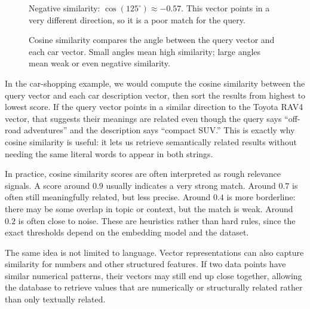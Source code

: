 \documentclass[12pt]{article}
\begin{document}
\begin{figure}[h]
\begin{minipage}[t]{0.31\textwidth}
\vspace{0.2em}
\scriptsize Negative similarity: $\cos(125^\circ) \approx -0.57$. This
vector points in a very different direction, so it is a poor match for the
query.
\end{minipage}
\caption{Cosine similarity compares the angle between the query vector and
each car vector. Small angles mean high similarity; large angles mean weak
or even negative similarity.}
\end{figure}

In the car-shopping example, we would compute the cosine similarity
between the query vector and each car description vector, then sort the
results from highest to lowest score. If the query vector points in a
similar direction to the Toyota RAV4 vector, that suggests their meanings
are related even though the query says ``off-road adventures'' and the
description says ``compact SUV.'' This is exactly why cosine similarity is
useful: it lets us retrieve semantically related results without needing
the same literal words to appear in both strings.

In practice, cosine similarity scores are often interpreted as rough
relevance signals. A score around $0.9$ usually indicates a very strong
match. Around $0.7$ is often still meaningfully related, but less precise.
Around $0.4$ is more borderline: there may be some overlap in topic or
context, but the match is weak. Around $0.2$ is often close to noise.
These are heuristics rather than hard rules, since the exact thresholds
depend on the embedding model and the dataset.

The same idea is not limited to language. Vector representations can also
capture similarity for numbers and other structured features. If two data
points have similar numerical patterns, their vectors may still end up
close together, allowing the database to retrieve values that are
numerically or structurally related rather than only textually related.
\end{document}
